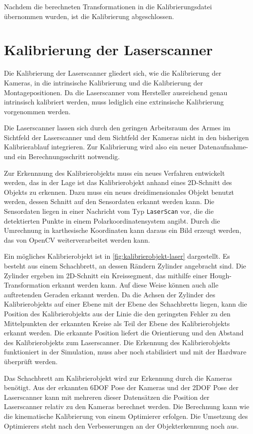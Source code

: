 Nachdem die berechneten Transformationen in die Kalibrierungsdatei übernommen 
wurden, ist die Kalibrierung abgeschlossen.


\section{Kalibrierung der Laserscanner}
\label{sec:Kalibrierung der Laserscanner}

Die Kalibrierung der Laserscanner gliedert sich, wie die Kalibrierung der 
Kameras, in die intrinsische Kalibrierung und die Kalibrierung der Montagepositionen.
Da die Laserscanner vom Hersteller ausreichend genau intrinsisch kalibriert werden,
muss lediglich eine extrinsische Kalibrierung vorgenommen werden. 

Die Laserscanner lassen sich durch den geringen Arbeitsraum des Armes im Sichtfeld 
der Laserscanner und dem Sichtfeld der
Kameras nicht in den bisherigen Kalibrierablauf integrieren. Zur Kalibrierung 
wird also ein neuer Datenaufnahme- und ein Berechnungsschritt notwendig. 

Zur Erkennnung des Kalibrierobjekts muss ein neues Verfahren entwickelt werden,
das in der Lage ist das Kalibrierobjekt anhand eines 2D-Schnitt des Objekts zu erkennen. Dazu muss
ein neues dreidimensionales Objekt benutzt werden, dessen Schnitt auf den 
Sensordaten erkannt werden kann. 
Die Sensordaten liegen in einer Nachricht vom Typ \texttt{LaserScan} vor, die 
die detektierten Punkte in einem Polarkoordinatensystem angibt. Durch die Umrechnung
in karthesische Koordinaten kann daraus ein Bild erzeugt werden, das von OpenCV
weiterverarbeitet werden kann.

Ein mögliches Kalibrierobjekt ist in \ref{fig:kalibrierobjekt-laser} dargestellt.
Es besteht aus einem Schachbrett, an dessen Rändern Zylinder angebracht sind.
Die Zylinder ergeben im 2D-Schnitt ein Kreissegment, das mithilfe einer 
Hough-Transformation \cite{rohtua} erkannt werden kann. Auf diese Weise können 
auch alle 
auftretenden Geraden erkannt werden. Da die Achsen der 
Zylinder des Kalibrierobjekts auf einer Ebene mit der Ebene des Schachbretts liegen, kann die
Position des Kalibrierobjekts aus der Linie die den geringsten Fehler zu den
Mittelpunkten der erkannten Kreise als Teil der Ebene des Kalibrierobjekts
erkannt werden. Die erkannte Position liefert die Orientierung und den Abstand
des Kalibrierobjekts zum Laserscanner. Die Erkennung des Kalibrierobjekts
funktioniert in der Simulation, muss aber noch stabilisiert und mit der
Hardware überprüft werden.

Das Schachbrett am Kalibrierobjekt wird zur Erkennung durch die Kameras benötigt.
Aus der erkannten 6\ac{DOF} Pose der Kameras und der 2\ac{DOF} Pose der Laserscanner 
kann mit mehreren dieser Datensätzen die Position der Laserscanner relativ zu den
Kameras berechnet werden. Die Berechnung kann wie die kinematische Kalibrierung
von einem Optimierer erfolgen. Die Umsetzung des Optimierers steht nach den
Verbesserungen an der Objekterkennung noch aus. 


